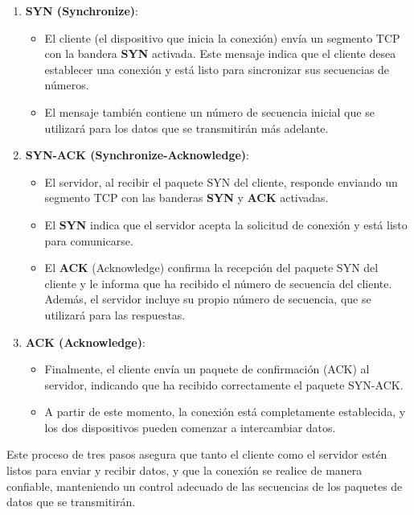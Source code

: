 \documentclass[a4paper,12pt]{article}
\begin{document}
\begin{enumerate}
    \item \textbf{SYN (Synchronize)}:
    \begin{itemize}
        \item El cliente (el dispositivo que inicia la conexión) envía un segmento TCP con la bandera \textbf{SYN} activada. Este mensaje indica que el cliente desea establecer una conexión y está listo para sincronizar sus secuencias de números.
        \item El mensaje también contiene un número de secuencia inicial que se utilizará para los datos que se transmitirán más adelante.
    \end{itemize}

    \item \textbf{SYN-ACK (Synchronize-Acknowledge)}:
    \begin{itemize}
        \item El servidor, al recibir el paquete SYN del cliente, responde enviando un segmento TCP con las banderas \textbf{SYN} y \textbf{ACK} activadas.
        \item El \textbf{SYN} indica que el servidor acepta la solicitud de conexión y está listo para comunicarse.
        \item El \textbf{ACK} (Acknowledge) confirma la recepción del paquete SYN del cliente y le informa que ha recibido el número de secuencia del cliente. Además, el servidor incluye su propio número de secuencia, que se utilizará para las respuestas.
    \end{itemize}

    \item \textbf{ACK (Acknowledge)}:
    \begin{itemize}
        \item Finalmente, el cliente envía un paquete de confirmación (ACK) al servidor, indicando que ha recibido correctamente el paquete SYN-ACK.
        \item A partir de este momento, la conexión está completamente establecida, y los dos dispositivos pueden comenzar a intercambiar datos.
    \end{itemize}
\end{enumerate}

Este proceso de tres pasos asegura que tanto el cliente como el servidor estén listos para enviar y recibir datos, y que la conexión se realice de manera confiable, manteniendo un control adecuado de las secuencias de los paquetes de datos que se transmitirán.
\end{document}
